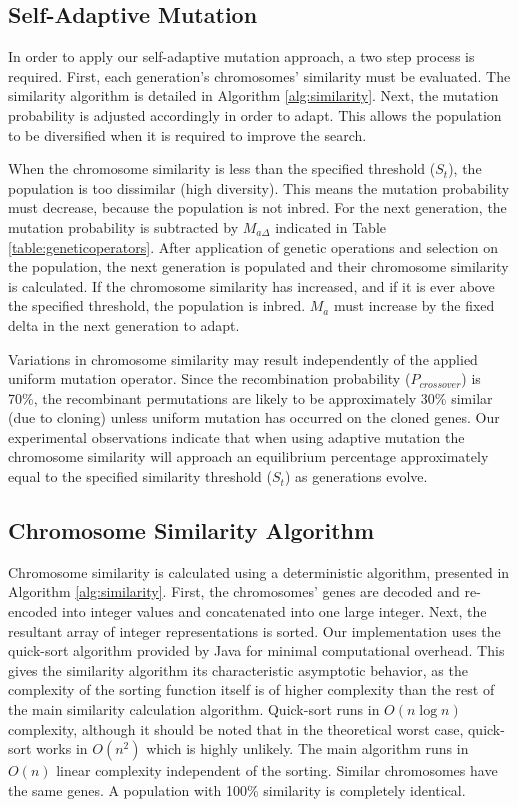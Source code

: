 \documentclass[conference]{IEEEtran}
\begin{document}
\subsection{Self-Adaptive Mutation}
In order to apply our self-adaptive mutation approach, a two step process is required. First, each generation's chromosomes' similarity must be evaluated. The similarity algorithm is detailed in Algorithm \ref{alg:similarity}. Next, the mutation probability is adjusted accordingly in order to adapt. This allows the population to be diversified when it is required to improve the search.

When the chromosome similarity is less than the specified threshold ($S_{t}$), the population is too dissimilar (high diversity). This means the mutation probability must decrease, because the population is not inbred. For the next generation, the mutation probability is subtracted by $M_{a\Delta}$ indicated in Table \ref{table:geneticoperators}. After application of genetic operations and selection on the population, the next generation is populated and their chromosome similarity is calculated. If the chromosome similarity has increased, and if it is ever above the specified threshold, the population is inbred. $M_{a}$ must increase by the fixed delta in the next generation to adapt.

Variations in chromosome similarity may result independently of the applied uniform mutation operator. Since the recombination probability ($P_{crossover}$) is 70\%, the recombinant permutations are likely to be approximately 30\% similar (due to cloning) unless uniform mutation has occurred on the cloned genes. Our experimental observations indicate that when using adaptive mutation the chromosome similarity will approach an equilibrium percentage approximately equal to the specified similarity threshold ($S_{t}$) as generations evolve.

\subsection{Chromosome Similarity Algorithm}
Chromosome similarity is calculated using a deterministic algorithm, presented in Algorithm \ref{alg:similarity}. First, the chromosomes' genes are decoded and re-encoded into integer values and concatenated into one large integer. Next, the resultant array of integer representations is sorted. Our implementation uses the quick-sort algorithm provided by Java for minimal computational overhead. This gives the similarity algorithm its characteristic asymptotic behavior, as the complexity of the sorting function itself is of higher complexity than the rest of the main similarity calculation algorithm. Quick-sort runs in $O(n \log n)$ complexity, although it should be noted that in the theoretical worst case, quick-sort works in $O(n^2)$ which is highly unlikely. The main algorithm runs in $O(n)$ linear complexity independent of the sorting. Similar chromosomes have the same genes. A population with 100\% similarity is completely identical.
\end{document}
